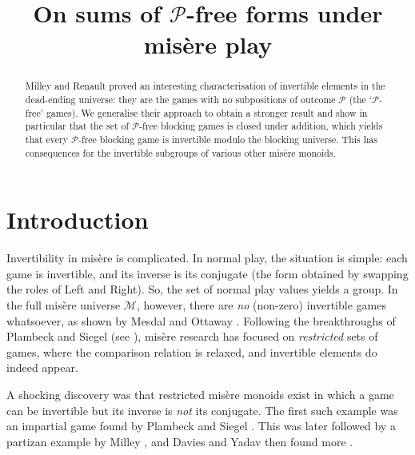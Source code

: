 \documentclass[11pt]{article}
\author[\arabic{authcount}]%
\author[#4]%
\title{On sums of $\mathscr{P}$-free forms under mis\`ere play}
\affil[1]{ Memorial University of Newfoundland\\Canada}
\affil[2]{ University of Maryland\\College Park\\USA}
\date{}
\theoremstyle{definition}
\newcommand{\set}[1]{\mathcal{#1}}
\begin{document}
\maketitle

\begin{abstract}
    \noindent
    Milley and Renault proved an interesting characterisation of invertible
    elements in the dead-ending universe: they are the games with no
    subpositions of outcome $\mathscr{P}$ (the `$\mathscr{P}$-free' games). We
    generalise their approach to obtain a stronger result and show in
    particular that the set of $\mathscr{P}$-free blocking games is closed
    under addition, which yields that every $\mathscr{P}$-free blocking game is
    invertible modulo the blocking universe. This has consequences for the
    invertible subgroups of various other mis\`ere monoids.
\end{abstract}

\section{Introduction}

Invertibility in mis\`ere is complicated. In normal play, the situation is
simple: each game is invertible, and its inverse is its conjugate (the form
obtained by swapping the roles of Left and Right). So, the set of normal play
values yields a group. In the full mis\`ere universe $\set{M}$, however, there
are \emph{no} (non-zero) invertible games whatsoever, as shown by Mesdal and
Ottaway \cite[Theorem 7 on p.~5]{mesdal.ottaway:simplification}. Following the
breakthroughs of Plambeck and Siegel (see \cite{plambeck.siegel:misere,
plambeck:taming}), mis\`ere research has focused on \emph{restricted} sets of
games, where the comparison relation is relaxed, and invertible elements do
indeed appear.

A shocking discovery was that restricted mis\`ere monoids exist in which a game
can be invertible but its inverse is \emph{not} its conjugate. The first such
example was an impartial game found by Plambeck and Siegel \cite[A.6 on
p.~617]{plambeck.siegel:misere}. This was later followed by a partizan example
by Milley \cite[Corollary 4 on p.~11]{milley:partizan}, and Davies and Yadav
then found more \cite[pp.~24--25]{davies.yadav:invertibility}.
\end{document}
